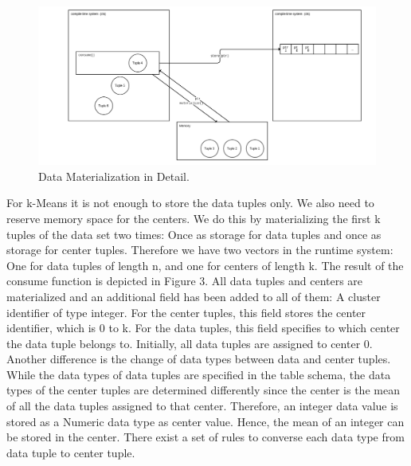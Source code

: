 \begin{figure}[htsb]
  \centering
  \includegraphics[scale=0.25]{figures/mat2}
  \caption[Data Materialization in Detail]{Data Materialization in Detail.}
  \label{fig:mat2}
\end{figure}

For k-Means it is not enough to store the data tuples only. We also need to reserve memory space for the centers. We do this by materializing the first k tuples of the data set two times: Once as storage for data tuples and once as storage for center tuples. Therefore we have two vectors in the runtime system: One for data tuples of length n, and one for centers of length k. The result of the consume function is depicted in Figure 3. 
All data tuples and centers are materialized and an additional field has been added to all of them: A cluster identifier of type integer. For the center tuples, this field stores the center identifier, which is 0 to k. For the data tuples, this field specifies to which center the data tuple belongs to. Initially, all data tuples are assigned to center 0. 
Another difference is the change of data types between data and center tuples. While the data types of data tuples are specified in the table schema, the data types of the center tuples are determined differently since the center is the mean of all the data tuples assigned to that center. Therefore, an integer data value is stored as a Numeric data type as center value. Hence, the mean of an integer can be stored in the center. There exist a set of rules to converse each data type from data tuple to center tuple.



